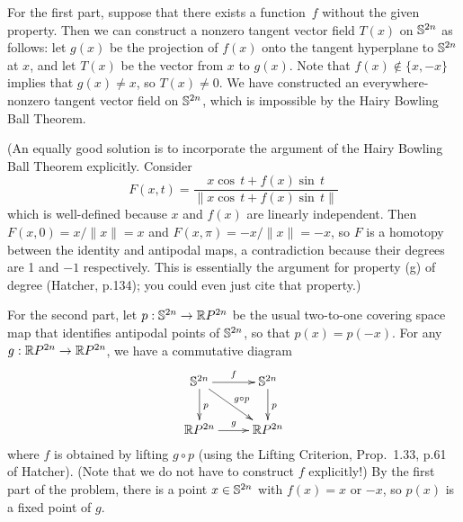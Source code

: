 
\soln For the first part, suppose that there exists a function~$f$ without the given property.  Then we can construct
a nonzero tangent vector field $T(x)$ on $\mathbb{S}^{2n}$ as follows: let $g(x)$ be the
projection of $f(x)$ onto the tangent hyperplane to $\mathbb{S}^{2n}$ at $x$, and
let $T(x)$ be the vector from $x$ to $g(x)$.  Note that $f(x)\not\in\{x,-x\}$
implies that $g(x)\neq x$, so $T(x)\neq 0$.  We have constructed an everywhere-nonzero
tangent vector field on $\mathbb{S}^{2n}$, which is impossible by the Hairy Bowling Ball Theorem.

(An equally good solution is to incorporate the argument of the Hairy Bowling Ball Theorem
explicitly.  Consider
$$F(x,t)=\frac{x\cos\,t+f(x)\sin\,t}{\|x\cos\,t+f(x)\sin\,t\|}$$
which is well-defined because $x$ and $f(x)$ are linearly independent.
Then $F(x,0)=x/\|x\|=x$ and $F(x,\pi)=-x/\|x\|=-x$, so $F$ is a homotopy 
between the identity and antipodal maps, a contradiction because their degrees
are 1 and $-1$ respectively.  This is essentially the argument for property (g) of
degree (Hatcher, p.134); you could even just cite that property.)

For the second part, let $p:\mathbb{S}^{2n}\to\mathbb{R} P^{2n}$ be the usual two-to-one covering space map
that identifies antipodal points of $\mathbb{S}^{2n}$, so that $p(x)=p(-x)$.  For any $g:\mathbb{R} P^{2n}\to\mathbb{R} P^{2n}$, we have a commutative
diagram
$$\xymatrix{
\Ss^{2n} \ar[r]^f\ar[d]^p\ar[dr]^{g\circ p} & \Ss^{2n} \ar[d]^p\\
\RP^{2n} \ar[r]^g & \RP^{2n}}$$
where $f$ is obtained by lifting $g\circ p$ (using the Lifting Criterion,
Prop.~1.33, p.61 of Hatcher).  (Note that we do not have to construct $f$ explicitly!)
By the first part of the problem, there is a point
$x\in \mathbb{S}^{2n}$ with $f(x)=x$ or $-x$, so $p(x)$ is a fixed point of $g$.


